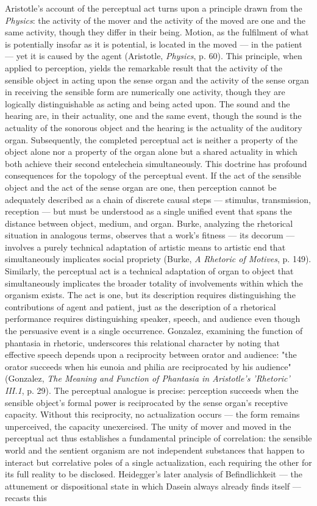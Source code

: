 Aristotle's account of the perceptual act turns upon a principle drawn from the \textit{Physics}: the activity of the mover and the activity of the moved are one and the same activity, though they differ in their being. Motion, as the fulfilment of what is potentially insofar as it is potential, is located in the moved --- in the patient --- yet it is caused by the agent (Aristotle, \textit{Physics}, p. 60). This principle, when applied to perception, yields the remarkable result that the activity of the sensible object in acting upon the sense organ and the activity of the sense organ in receiving the sensible form are numerically one activity, though they are logically distinguishable as acting and being acted upon. The sound and the hearing are, in their actuality, one and the same event, though the sound is the actuality of the sonorous object and the hearing is the actuality of the auditory organ. Subsequently, the completed perceptual act is neither a property of the object alone nor a property of the organ alone but a shared actuality in which both achieve their second entelecheia simultaneously. This doctrine has profound consequences for the topology of the perceptual event. If the act of the sensible object and the act of the sense organ are one, then perception cannot be adequately described as a chain of discrete causal steps --- stimulus, transmission, reception --- but must be understood as a single unified event that spans the distance between object, medium, and organ. Burke, analyzing the rhetorical situation in analogous terms, observes that a work's fitness --- its decorum --- involves a purely technical adaptation of artistic means to artistic end that simultaneously implicates social propriety (Burke, \textit{A Rhetoric of Motives}, p. 149). Similarly, the perceptual act is a technical adaptation of organ to object that simultaneously implicates the broader totality of involvements within which the organism exists. The act is one, but its description requires distinguishing the contributions of agent and patient, just as the description of a rhetorical performance requires distinguishing speaker, speech, and audience even though the persuasive event is a single occurrence. Gonzalez, examining the function of phantasia in rhetoric, underscores this relational character by noting that effective speech depends upon a reciprocity between orator and audience: "the orator succeeds when his eunoia and philia are reciprocated by his audience" (Gonzalez, \textit{The Meaning and Function of Phantasia in Aristotle's 'Rhetoric' III.1}, p. 29). The perceptual analogue is precise: perception succeeds when the sensible object's formal power is reciprocated by the sense organ's receptive capacity. Without this reciprocity, no actualization occurs --- the form remains unperceived, the capacity unexercised. The unity of mover and moved in the perceptual act thus establishes a fundamental principle of correlation: the sensible world and the sentient organism are not independent substances that happen to interact but correlative poles of a single actualization, each requiring the other for its full reality to be disclosed. Heidegger's later analysis of Befindlichkeit --- the attunement or dispositional state in which Dasein always already finds itself --- recasts this 